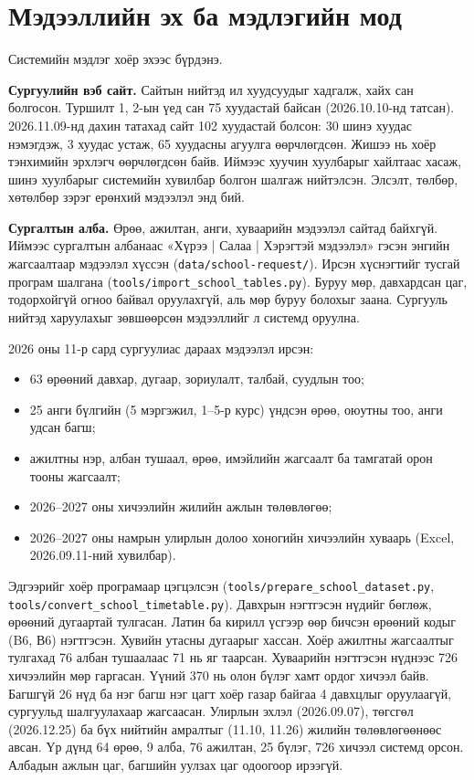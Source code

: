 \section{Мэдээллийн эх ба мэдлэгийн мод}
\label{sec:data-sources}

Системийн мэдлэг хоёр эхээс бүрдэнэ.

\textbf{Сургуулийн вэб сайт.} Сайтын нийтэд ил хуудсуудыг хадгалж, хайх сан болгосон. Туршилт 1, 2-ын үед сан 75 хуудастай байсан (2026.10.10-нд татсан). 2026.11.09-нд дахин татахад сайт 102 хуудастай болсон: 30 шинэ хуудас нэмэгдэж, 3 хуудас устаж, 65 хуудасны агуулга өөрчлөгдсөн. Жишээ нь хоёр тэнхимийн эрхлэгч өөрчлөгдсөн байв. Иймээс хуучин хуулбарыг хайлтаас хасаж, шинэ хуулбарыг системийн хувилбар болгон шалгаж нийтэлсэн. Элсэлт, төлбөр, хөтөлбөр зэрэг ерөнхий мэдээлэл энд бий.

\textbf{Сургалтын алба.} Өрөө, ажилтан, анги, хуваарийн мэдээлэл сайтад байхгүй. Иймээс сургалтын албанаас «Хүрээ | Салаа | Хэрэгтэй мэдээлэл» гэсэн энгийн жагсаалтаар мэдээлэл хүссэн (\texttt{data/\allowbreak school-request/}). Ирсэн хүснэгтийг тусгай програм шалгана (\texttt{tools/\allowbreak import\_school\_tables.py}). Буруу мөр, давхардсан цаг, тодорхойгүй огноо байвал оруулахгүй, аль мөр буруу болохыг заана. Сургууль нийтэд харуулахыг зөвшөөрсөн мэдээллийг л системд оруулна.

2026 оны 11-р сард сургуулиас дараах мэдээлэл ирсэн:
\begin{itemize}
    \item 63 өрөөний давхар, дугаар, зориулалт, талбай, суудлын тоо;
    \item 25 анги бүлгийн (5 мэргэжил, 1--5-р курс) үндсэн өрөө, оюутны тоо, анги удсан багш;
    \item ажилтны нэр, албан тушаал, өрөө, имэйлийн жагсаалт ба тамгатай орон тооны жагсаалт;
    \item 2026--2027 оны хичээлийн жилийн ажлын төлөвлөгөө;
    \item 2026--2027 оны намрын улирлын долоо хоногийн хичээлийн хуваарь (Excel, 2026.09.11-ний хувилбар).
\end{itemize}
Эдгээрийг хоёр програмаар цэгцэлсэн (\texttt{tools/\allowbreak prepare\_school\_dataset.py}, \texttt{tools/\allowbreak convert\_school\_timetable.py}). Давхрын нэгтгэсэн нүдийг бөглөж, өрөөний дугаартай тулгасан. Латин ба кирилл үсгээр өөр бичсэн өрөөний кодыг (B6, В6) нэгтгэсэн. Хувийн утасны дугаарыг хассан. Хоёр ажилтны жагсаалтыг тулгахад 76 албан тушаалаас 71 нь яг таарсан. Хуваарийн нэгтгэсэн нүднээс 726 хичээлийн мөр гаргасан. Үүний 370 нь олон бүлэг хамт ордог хичээл байв. Багшгүй 26 нүд ба нэг багш нэг цагт хоёр газар байгаа 4 давхцлыг оруулаагүй, сургуульд шалгуулахаар жагсаасан. Улирлын эхлэл (2026.09.07), төгсгөл (2026.12.25) ба бүх нийтийн амралтыг (11.10, 11.26) жилийн төлөвлөгөөнөөс авсан. Үр дүнд 64 өрөө, 9 алба, 76 ажилтан, 25 бүлэг, 726 хичээл системд орсон. Албадын ажлын цаг, багшийн уулзах цаг одоогоор ирээгүй.

